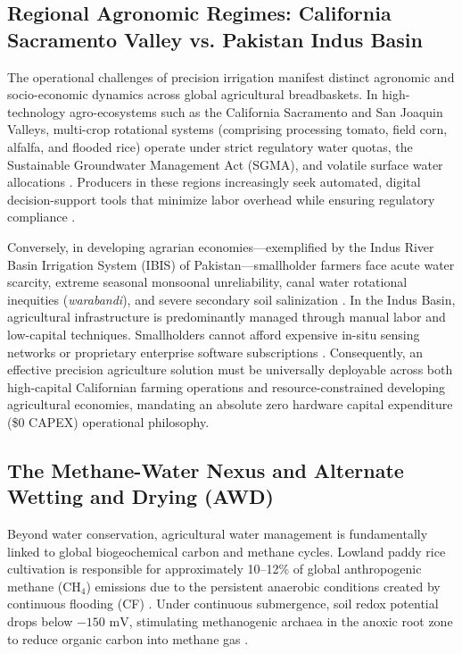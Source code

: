 \documentclass[sn-mathphys-num,Numbered]{sn-jnl}
\begin{document}
\subsection{Regional Agronomic Regimes: California Sacramento Valley vs. Pakistan Indus Basin}\label{sec:intro_regional}
The operational challenges of precision irrigation manifest distinct agronomic and socio-economic dynamics across global agricultural breadbaskets. In high-technology agro-ecosystems such as the California Sacramento and San Joaquin Valleys, multi-crop rotational systems (comprising processing tomato, field corn, alfalfa, and flooded rice) operate under strict regulatory water quotas, the Sustainable Groundwater Management Act (SGMA), and volatile surface water allocations \cite{Anderson2012,Fisher2017}. Producers in these regions increasingly seek automated, digital decision-support tools that minimize labor overhead while ensuring regulatory compliance \cite{Gorelick2017}.

Conversely, in developing agrarian economies—exemplified by the Indus River Basin Irrigation System (IBIS) of Pakistan—smallholder farmers face acute water scarcity, extreme seasonal monsoonal unreliability, canal water rotational inequities (\textit{warabandi}), and severe secondary soil salinization \cite{Hassani2021,Belder2004}. In the Indus Basin, agricultural infrastructure is predominantly managed through manual labor and low-capital techniques. Smallholders cannot afford expensive in-situ sensing networks or proprietary enterprise software subscriptions \cite{Benos2021,Kamilaris2018}. Consequently, an effective precision agriculture solution must be universally deployable across both high-capital Californian farming operations and resource-constrained developing agricultural economies, mandating an absolute zero hardware capital expenditure (\$0 CAPEX) operational philosophy.

\subsection{The Methane-Water Nexus and Alternate Wetting and Drying (AWD)}\label{sec:intro_awd_nexus}
Beyond water conservation, agricultural water management is fundamentally linked to global biogeochemical carbon and methane cycles. Lowland paddy rice cultivation is responsible for approximately 10--12\% of global anthropogenic methane ($\mathrm{CH}_4$) emissions due to the persistent anaerobic conditions created by continuous flooding (CF) \cite{Linquist2012,IPCC2019,Reba2019}. Under continuous submergence, soil redox potential drops below $-150\text{ mV}$, stimulating methanogenic archaea in the anoxic root zone to reduce organic carbon into methane gas \cite{Richards1931,vanGenuchten1980}.
\end{document}
